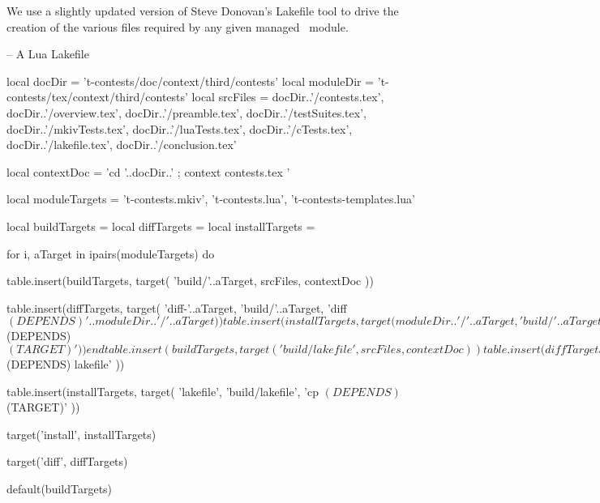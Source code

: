 
\startchapter[title=Lakefile]

We use a slightly updated version of Steve Donovan's Lakefile tool to 
drive the creation of the various files required by any given 
 managed \ConTeXt\ module. 

\startLakefile
-- A Lua Lakefile

local docDir    = 't-contests/doc/context/third/contests'
local moduleDir = 't-contests/tex/context/third/contests'
local srcFiles = {
  docDir..'/contests.tex',
  docDir..'/overview.tex',
  docDir..'/preamble.tex',
  docDir..'/testSuites.tex',
  docDir..'/mkivTests.tex',
  docDir..'/luaTests.tex',
  docDir..'/cTests.tex',
  docDir..'/lakefile.tex',
  docDir..'/conclusion.tex'
}

local contextDoc = 
  'cd '..docDir..' ; context contests.tex '

local moduleTargets = {
  't-contests.mkiv',
  't-contests.lua',
  't-contests-templates.lua'
}

local buildTargets   = { }
local diffTargets    = { }
local installTargets = { }

for i, aTarget in ipairs(moduleTargets) do

  table.insert(buildTargets, target(
    'build/'..aTarget,
    srcFiles,
    contextDoc
  ))

  table.insert(diffTargets, target(
    'diff-'..aTarget,
    'build/'..aTarget,
    'diff $(DEPENDS) '..moduleDir..'/'..aTarget
  ))

  table.insert(installTargets, target(
    moduleDir..'/'..aTarget,
    'build/'..aTarget,
    'cp $(DEPENDS) $(TARGET)'
  ))
end

table.insert(buildTargets, target(
  'build/lakefile',
  srcFiles,
  contextDoc
))

table.insert(diffTargets, target(
  'diff-lakefile',
  'build/lakefile',
  'diff $(DEPENDS) lakefile'
))

table.insert(installTargets, target(
  'lakefile',
  'build/lakefile',
  'cp $(DEPENDS) $(TARGET)'
))

target('install', installTargets)

target('diff', diffTargets)

default(buildTargets)

\stopLakefile

\stopchapter
